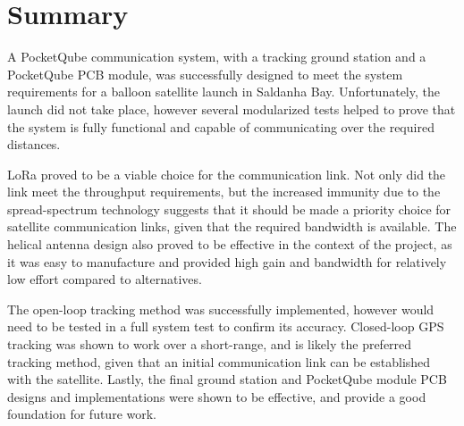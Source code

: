 \section{Summary}

A PocketQube communication system, with a tracking ground station and a PocketQube PCB module, was successfully designed to meet the system requirements for a balloon satellite launch in Saldanha Bay. Unfortunately, the launch did not take place, however several modularized tests helped to prove that the system is fully functional and capable of communicating over the required distances.

LoRa proved to be a viable choice for the communication link. Not only did the link meet the throughput requirements, but the increased immunity due to the spread-spectrum technology suggests that it should be made a priority choice for satellite communication links, given that the required bandwidth is available. The helical antenna design also proved to be effective in the context of the project, as it was easy to manufacture and provided high gain and bandwidth for relatively low effort compared to alternatives.

The open-loop tracking method was successfully implemented, however would need to be tested in a full system test to confirm its accuracy. Closed-loop GPS tracking was shown to work over a short-range, and is likely the preferred tracking method, given that an initial communication link can be established with the satellite. Lastly, the final ground station and PocketQube module PCB designs and implementations were shown to be effective, and provide a good foundation for future work.
